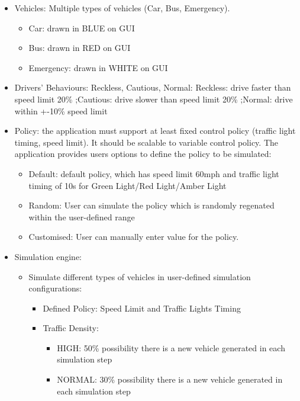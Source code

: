 \documentclass[11pt]{article}
\begin{document}
\begin{itemize}
\begin{itemize}
\begin{itemize}[noitemsep]
	
    	\end{itemize}

        \item Vehicles: Multiple types of vehicles (Car, Bus, Emergency). 
            \begin{itemize}
                \item Car: drawn in BLUE on GUI
                \item Bus: drawn in RED on GUI
                \item Emergency: drawn in WHITE on GUI
            \end{itemize}
       
        
        \item Drivers' Behaviours: Reckless, Cautious, Normal:
        Reckless: drive faster than speed limit 20\%
        ;Cautious: drive slower than speed limit 20\%
        ;Normal: drive within +-10\% speed limit
        
        \item Policy: the application must support at least fixed control policy (traffic light timing, speed limit). It should be scalable to variable control policy. The application provides users options to define the policy to be simulated:
            \begin{itemize}
                \item Default: default policy, which has speed limit 60mph and traffic light timing of 10s for Green Light/Red Light/Amber Light
                \item Random: User can simulate the policy which is randomly regenated within the user-defined range
                \item Customised: User can manually enter value for the policy.
            \end{itemize}

        \item Simulation engine: 
        \begin{itemize}
        
        \item Simulate different types of vehicles in user-defined simulation configurations:
            \begin{itemize}
            \item Defined Policy: Speed Limit and Traffic Lights Timing
            \item Traffic Density:
                \begin{itemize}
                \item HIGH: 50\% possibility there is a new vehicle generated in each simulation step
                \item NORMAL: 30\% possibility there is a new vehicle generated in each simulation step
                

\end{itemize}
\end{itemize}
\end{itemize}
\end{itemize}
\end{itemize}
\end{document}
